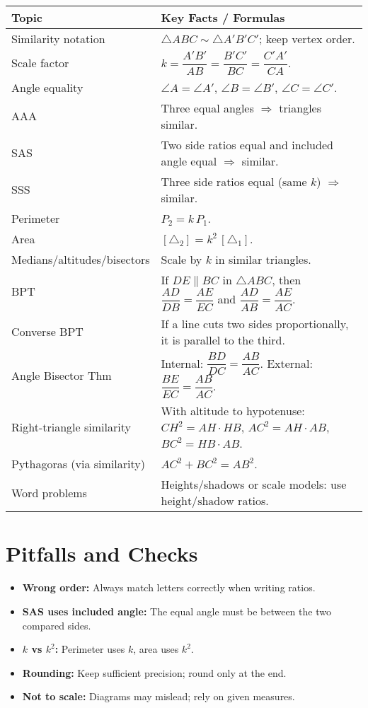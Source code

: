 \documentclass[11pt,a4paper]{article}
\begin{document}
\begin{propertybox}
\begin{tabularx}{\textwidth}{@{} l X @{} }
\toprule
\textbf{Topic} & \textbf{Key Facts / Formulas} \\
\midrule
Similarity notation & $\triangle ABC \sim \triangle A'B'C'$; keep vertex order. \\
Scale factor & $k = \dfrac{A'B'}{AB} = \dfrac{B'C'}{BC} = \dfrac{C'A'}{CA}$. \\
Angle equality & $\angle A = \angle A'$, $\angle B = \angle B'$, $\angle C = \angle C'$. \\
AAA & Three equal angles $\Rightarrow$ triangles similar. \\
SAS & Two side ratios equal and included angle equal $\Rightarrow$ similar. \\
SSS & Three side ratios equal (same $k$) $\Rightarrow$ similar. \\
Perimeter & $P_2 = k\,P_1$. \\
Area & $[\triangle_2] = k^2\,[\triangle_1]$. \\
Medians/altitudes/bisectors & Scale by $k$ in similar triangles. \\
BPT & If $DE\parallel BC$ in $\triangle ABC$, then $\dfrac{AD}{DB}=\dfrac{AE}{EC}$ and $\dfrac{AD}{AB}=\dfrac{AE}{AC}$. \\
Converse BPT & If a line cuts two sides proportionally, it is parallel to the third. \\
Angle Bisector Thm & Internal: $\dfrac{BD}{DC}=\dfrac{AB}{AC}$. External: $\dfrac{BE}{EC}=\dfrac{AB}{AC}$. \\
Right-triangle similarity & With altitude to hypotenuse: $CH^2=AH\cdot HB$, $AC^2=AH\cdot AB$, $BC^2=HB\cdot AB$. \\
Pythagoras (via similarity) & $AC^2 + BC^2 = AB^2$. \\
Word problems & Heights/shadows or scale models: use $\text{height}/\text{shadow}$ ratios. \\
\bottomrule
\end{tabularx}
\end{propertybox}

\newpage

\section*{Pitfalls and Checks}
\begin{warningbox}
\begin{itemize}
  \item \textbf{Wrong order:} Always match letters correctly when writing ratios.
  \item \textbf{SAS uses included angle:} The equal angle must be between the two compared sides.
  \item \textbf{$k$ vs $k^2$:} Perimeter uses $k$, area uses $k^2$.
  \item \textbf{Rounding:} Keep sufficient precision; round only at the end.
  \item \textbf{Not to scale:} Diagrams may mislead; rely on given measures.
\end{itemize}
\end{warningbox}
\end{document}
